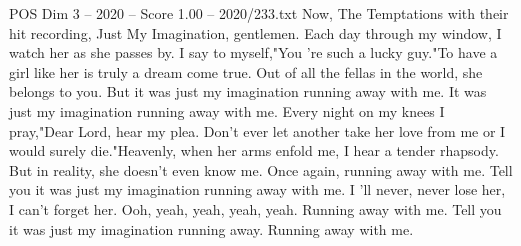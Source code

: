 \begin{textsample}{POS Dim 3 – 2020 – Score 1.00 – 2020/233.txt}  \label{ex:f3_pos_017}
Now, The Temptations with their hit recording, Just My Imagination, gentlemen.
Each day through my window, I watch her as she passes by.
I say to myself,"You 're such a lucky guy."To have a girl like her is truly a dream come true.
Out of all the fellas in the world, she belongs to you.
But it was just my imagination running away with me.
It was just my imagination running away with me.
Every night on my knees I pray,"Dear Lord, hear my plea.
Don't ever let another take her love from me or I would surely die."Heavenly, when her arms enfold me, I hear a tender rhapsody.
But in reality, she doesn't even know me.
Once again, running away with me.
Tell you it was just my imagination running away with me.
I 'll never, never lose her, I can't forget her.
Ooh, yeah, yeah, yeah, yeah.
Running away with me.
Tell you it was just my imagination running away.
Running away with me.

\end{textsample}
